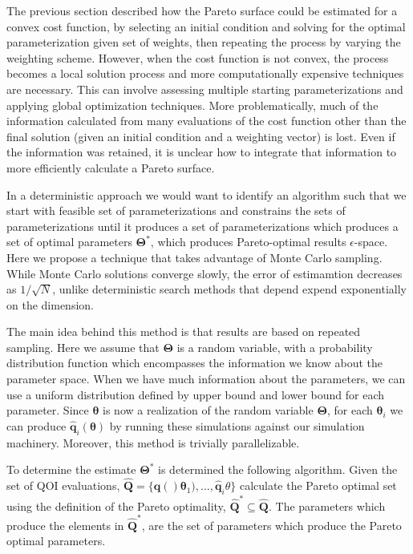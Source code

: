 The previous section described how the Pareto surface could be estimated for a convex cost function, by selecting an initial condition and solving for the optimal parameterization given set of weights, then repeating the process by varying the weighting scheme.  However, when the cost function is not convex, the process becomes a local solution process and more computationally expensive techniques are necessary.  This can involve assessing multiple starting parameterizations and applying global optimization techniques.  More problematically, much of the information calculated from many evaluations of the cost function other than the final solution (given an initial condition and a weighting vector) is lost.  Even if the information was retained, it is unclear how to integrate that information to more efficiently calculate a Pareto surface.

In a deterministic approach we would want to identify an algorithm such that we start with feasible set of parameterizations and constrains the sets of parameterizations until it produces a set of parameterizations which produces a set of optimal parameters $\bm{\Theta}^*$, which produces Pareto-optimal results $\epsilon$-space.  Here we propose a technique that takes advantage of Monte Carlo sampling.  While Monte Carlo solutions converge slowly, the error of estimamtion decreases as $1/\sqrt{N}$, unlike deterministic search methods that depend expend exponentially on the dimension\cite{caflisch1998_mc}.

The main idea behind this method is that results are based on repeated sampling.  Here we assume that $\bm{\Theta}$ is a random variable, with a probability distribution function which encompasses the information we know about the parameter space.  When we have much information about the parameters, we can use a uniform distribution defined by upper bound and lower bound for each parameter.  Since $\bm{\theta}$ is now a realization of the random variable $\bm{\Theta}$, for each $\bm{\theta}_i$ we can produce $\hat{\bm{q}}_i(\bm{\theta})$ by running these simulations against our simulation machinery.  Moreover, this method is trivially parallelizable.

To determine the estimate $\bm{\Theta}^*$ is determined the following algorithm.  Given the set of QOI evaluations, $\hat{\bm{Q}}=\{\hat{\bm{q}}()\bm{\theta}_1),...,\hat{\bm{q}}_i{\theta}\}$ calculate the Pareto optimal set using the definition of the Pareto optimality, $\hat{\bm{Q}}^* \subseteq \hat{\bm{Q}}$.   The parameters which produce the elements in $\hat{\bm{Q}}^*$, are the set of parameters which produce the Pareto optimal parameters.

